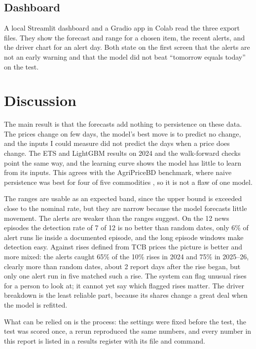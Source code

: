 \subsection{Dashboard}
A local Streamlit dashboard and a Gradio app in Colab read the three export files. They show the forecast and range for a chosen item, the recent alerts, and the driver chart for an alert day. Both state on the first screen that the alerts are not an early warning and that the model did not beat ``tomorrow equals today'' on the test.

\section{Discussion}
The main result is that the forecasts add nothing to persistence on these data. The prices change on few days, the model's best move is to predict no change, and the inputs I could measure did not predict the days when a price does change. The ETS and LightGBM results on 2024 and the walk-forward checks point the same way, and the learning curve shows the model has little to learn from its inputs. This agrees with the AgriPriceBD benchmark, where naive persistence was best for four of five commodities \cite{agripricebd}, so it is not a flaw of one model.

The ranges are usable as an expected band, since the upper bound is exceeded close to the nominal rate, but they are narrow because the model forecasts little movement. The alerts are weaker than the ranges suggest. On the 12 news episodes the detection rate of 7 of 12 is no better than random dates, only 6\% of alert runs lie inside a documented episode, and the long episode windows make detection easy. Against rises defined from TCB prices the picture is better and more mixed: the alerts caught 65\% of the 10\% rises in 2024 and 75\% in 2025--26, clearly more than random dates, about 2 report days after the rise began, but only one alert run in five matched such a rise. The system can flag unusual rises for a person to look at; it cannot yet say which flagged rises matter. The driver breakdown is the least reliable part, because its shares change a great deal when the model is refitted.

What can be relied on is the process: the settings were fixed before the test, the test was scored once, a rerun reproduced the same numbers, and every number in this report is listed in a results register with its file and command.
